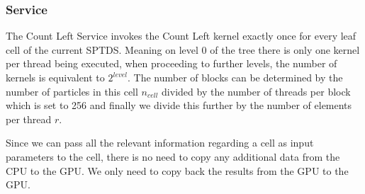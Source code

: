 \documentclass[]{article}
\begin{document}
\subsubsection{Service}

The Count Left Service invokes the Count Left kernel exactly once for every leaf cell of the current SPTDS. Meaning on level 0 of the tree there is only one kernel per thread being executed, when proceeding to further levels, the number of kernels is equivalent to $2^{level}$. 
The number of blocks can be determined by the number of particles in this cell $n_{cell}$ divided by the number of threads per block which is set to 256 and finally we divide this further by the number of elements per thread $r$. 

Since we can pass all the relevant information regarding a cell as input parameters to the cell, there is no need to copy any additional data from the CPU to the GPU. We only need to copy back the results from the GPU to the GPU.
\end{document}
